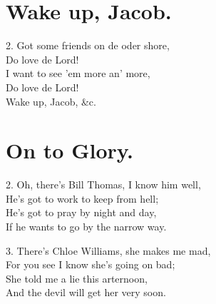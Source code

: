 \documentclass[a5paper,10pt]{book}
\begin{document}
\section{Wake up, Jacob.}
\thispagestyle{empty}

\begin{song}
\end{song}

\begin{stanza}
\item[2.]
  Got some friends on de oder shore,\\
  Do love de Lord!\\
  I want to see 'em more an' more,\\
  Do love de Lord!\\
  Wake up, Jacob, \&c.
\end{stanza}


\newpage
\section{On to Glory.}
\thispagestyle{empty}

\begin{song}
\end{song}

\begin{stanza}
\item[2.]
  Oh, there's Bill Thomas, I know him well,\\
  He's got to work to keep from hell;\\
  He's got to pray by night and day,\\
  If he wants to go by the narrow way.
\item[3.]
  There's Chloe Williams, she makes me mad,\\
  For you see I know she's going on bad;\\
  She told me a lie this arternoon,\\
  And the devil will get her very soon.
\end{stanza}

\begin{extra}
\end{extra}
\end{document}
